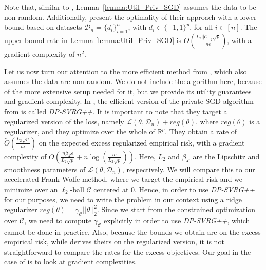 \documentclass{article}
\begin{document}
Note that, similar to \cite{NOPL}, Lemma~\ref{lemma:Util_Priv_SGD} assumes the data to be non-random. Additionally, \cite{Bassily_SGD_l2} present the optimality of their approach with a lower bound based on datasets $\mathcal{D}_n = \{d_i\}_{i = 1}^n$, with $d_i \in \{-1, 1\}^p$, for all $i \in [n]$. The upper bound rate in Lemma \ref{lemma:Util_Priv_SGD} is $\widetilde{O}\left(\frac{L_2||\mathcal{C}||_2\sqrt{p}}{n\epsilon}\right)$, with a gradient complexity of $n^2$.

Let us now turn our attention to the more efficient method from \cite{DP_ERM_Faster}, which also assumes the data are non-random. We do not include the algorithm here, because of the more extensive setup needed for it, but we provide its utility guarantees and gradient complexity. In \cite{DP_ERM_Faster}, the efficient version of the private SGD algorithm from \cite{Bassily_SGD_l2} is called \emph{DP-SVRG++}. It is important to note that they target a regularized version of the loss, namely $\mathcal{L}(\theta, \mathcal{D}_n) + reg(\theta)$, where $reg(\theta)$ is a regularizer, and they optimize over the whole of $\mathbb{R}^p$. They obtain a rate of $\widetilde{O}
\left(\frac{L_2\sqrt{p}}{n\epsilon}\right)$ on the expected excess regularized empirical risk, with a gradient complexity of $O\left(\frac{n\beta_{\mathcal{L}}\epsilon}{L_2\sqrt{p}} + n\log\left(\frac{n\epsilon}{L_2\sqrt{p}}\right)\right)$. Here, $L_2$ and $\beta_{\mathcal{L}}$ are the Lipschitz and smoothness parameters of $\mathcal{L}(\theta, \mathcal{D}_n)$, respectively. We will compare this to our accelerated Frank-Wolfe method, where we target the empirical risk and we minimize over an $\ell_2$-ball $\mathcal{C}$ centered at $0$. Hence, in order to use \emph{DP-SVRG++} for our purposes, we need to write the problem in our context using a ridge regularizer $reg(\theta) = \gamma_{\mathcal{C}}||\theta||_2^2$. Since we start from the constrained optimization over $\mathcal{C}$, we need to compute $\gamma_{\mathcal{C}}$ explicitly in order to use \emph{DP-SVRG++}, which cannot be done in practice. Also, because the bounds we obtain are on the excess empirical risk, while \cite{DP_ERM_Faster} derives theirs on the regularized version, it is not straightforward to compare the rates for the excess objectives. Our goal in the case of \cite{DP_ERM_Faster} is to look at gradient complexities. 
\end{document}

